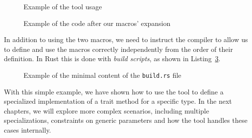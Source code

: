 \begin{figure}[htbp!]
	\centering
	\captionsetup{type=listing,skip=2pt}
	\caption{Example of the tool usage}
	\label{fig:monomorphic_specialization_pre}
\end{figure}

\begin{figure}[htbp!]
	\centering
	\captionsetup{type=listing,skip=2pt}
	\caption{Example of the code after our macros' expansion}
	\label{fig:monomorphic_specialization_post}
\end{figure}

In addition to using the two macros, we need to instruct the compiler to allow us to define and use the macros correctly independently from the order of their definition.
In Rust this is done with \textit{build scripts}, as shown in Listing~\ref{fig:monomorphic_specialization_build_rs}.

\begin{figure}[htbp!]
	\centering
	\captionsetup{type=listing,skip=2pt}
	\caption{Example of the minimal content of the \texttt{build.rs} file}
	\label{fig:monomorphic_specialization_build_rs}
\end{figure}

With this simple example, we have shown how to use the tool to define a specialized implementation of a trait method for a specific type.
In the next chapters, we will explore more complex scenarios, including multiple specializations, constraints on generic parameters and how the tool handles these cases internally.
